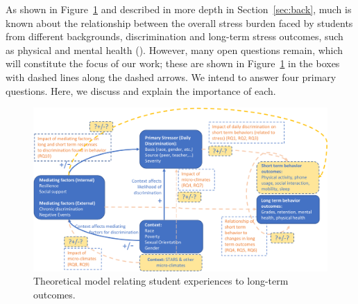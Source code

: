 
As shown in Figure~\ref{fig:model} and described in more depth in Section~\ref{sec:back}, much is known about the relationship between the overall stress burden faced by students from different backgrounds, discrimination and long-term stress outcomes, such as physical and mental health  (\eg \cite{Ong:2009}). However, many open questions remain, which will constitute the focus of our work; these are shown in Figure~\ref{fig:model} in the boxes with dashed lines along the dashed arrows. We intend to answer four primary questions. Here, we discuss and explain the importance of each.

\begin{figure}
    \centering
    \includegraphics[width=12cm]{img/discrimination-model.png}
    \caption{Theoretical model relating student experiences to long-term outcomes.}
    \label{fig:model}
\end{figure}


